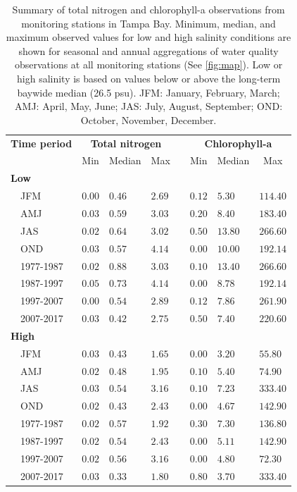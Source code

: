 \documentclass[]{article}
\begin{document}
\begin{table}[!tbp]
\caption{Summary of total nitrogen and chlorophyll-a observations from monitoring stations in Tampa Bay.  Minimum, median, and maximum observed values for low and high salinity conditions are shown for seasonal and annual aggregations of water quality observations at all monitoring stations (See \cref{fig:map}).  Low or high salinity is based on values below or above the long-term baywide median (26.5 psu). JFM: January, February, March; AMJ: April, May, June; JAS: July, August, September; OND: October, November, December.\label{tab:statsum}} 
\begin{center}
\begin{tabular}{llllclll}
\hline\hline
\multicolumn{1}{l}{\bfseries Time period}&\multicolumn{3}{c}{\bfseries Total nitrogen}&\multicolumn{1}{c}{\bfseries }&\multicolumn{3}{c}{\bfseries Chlorophyll-a}\tabularnewline
\cline{2-4} \cline{6-8}
\multicolumn{1}{l}{}&\multicolumn{1}{c}{Min}&\multicolumn{1}{c}{Median}&\multicolumn{1}{c}{Max}&\multicolumn{1}{c}{}&\multicolumn{1}{c}{Min}&\multicolumn{1}{c}{Median}&\multicolumn{1}{c}{Max}\tabularnewline
\hline
{\bfseries Low}&&&&&&&\tabularnewline
~~JFM&$0.00$&$0.46$&$2.69$&&$0.12$&$ 5.30$&$114.40$\tabularnewline
~~AMJ&$0.03$&$0.59$&$3.03$&&$0.20$&$ 8.40$&$183.40$\tabularnewline
~~JAS&$0.02$&$0.64$&$3.02$&&$0.50$&$13.80$&$266.60$\tabularnewline
~~OND&$0.03$&$0.57$&$4.14$&&$0.00$&$10.00$&$192.14$\tabularnewline
~~1977-1987&$0.02$&$0.88$&$3.03$&&$0.10$&$13.40$&$266.60$\tabularnewline
~~1987-1997&$0.05$&$0.73$&$4.14$&&$0.00$&$ 8.78$&$192.14$\tabularnewline
~~1997-2007&$0.00$&$0.54$&$2.89$&&$0.12$&$ 7.86$&$261.90$\tabularnewline
~~2007-2017&$0.03$&$0.42$&$2.75$&&$0.50$&$ 7.40$&$220.60$\tabularnewline
\hline
{\bfseries High}&&&&&&&\tabularnewline
~~JFM&$0.03$&$0.43$&$1.65$&&$0.00$&$ 3.20$&$ 55.80$\tabularnewline
~~AMJ&$0.02$&$0.48$&$1.95$&&$0.10$&$ 5.40$&$ 74.90$\tabularnewline
~~JAS&$0.03$&$0.54$&$3.16$&&$0.10$&$ 7.23$&$333.40$\tabularnewline
~~OND&$0.02$&$0.43$&$2.43$&&$0.00$&$ 4.67$&$142.90$\tabularnewline
~~1977-1987&$0.02$&$0.57$&$1.92$&&$0.30$&$ 7.30$&$136.80$\tabularnewline
~~1987-1997&$0.02$&$0.54$&$2.43$&&$0.00$&$ 5.11$&$142.90$\tabularnewline
~~1997-2007&$0.02$&$0.56$&$3.16$&&$0.00$&$ 4.80$&$ 72.30$\tabularnewline
~~2007-2017&$0.03$&$0.33$&$1.80$&&$0.80$&$ 3.70$&$333.40$\tabularnewline
\hline
\end{tabular}\end{center}
\end{table}
\end{document}

